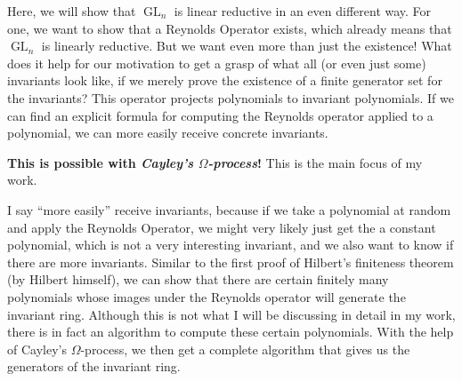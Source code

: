 Here, we will show that $\operatorname{GL}_n$ is linear reductive in an even different way.
For one, we want to show that a Reynolds Operator exists, which already means that $\operatorname{GL}_n$ is linearly reductive.
But we want even more than just the existence!
What does it help for our motivation to get a grasp of what all (or even just some) invariants look like, if we merely prove the existence of a finite generator set for the invariants?
This operator projects polynomials to invariant polynomials.
If we can find an explicit formula for computing the Reynolds operator applied to a polynomial, we can more easily receive concrete invariants.

\textbf{This is possible with \textit{Cayley's $\Omega$-process}!}
This is the main focus of my work.

I say ``more easily'' receive invariants, because if we take a polynomial at random and apply the Reynolds Operator, we might very likely just get the a constant polynomial, which is not a very interesting invariant, and we also want to know if there are more invariants.
Similar to the first proof of Hilbert's finiteness theorem (by Hilbert himself), we can show that there are certain finitely many polynomials whose images under the Reynolds operator will generate the invariant ring.
Although this is not what I will be discussing in detail in my work, there is in fact an algorithm to compute these certain polynomials.
With the help of Cayley's $\Omega$-process, we then get a complete algorithm that gives us the generators of the invariant ring.

